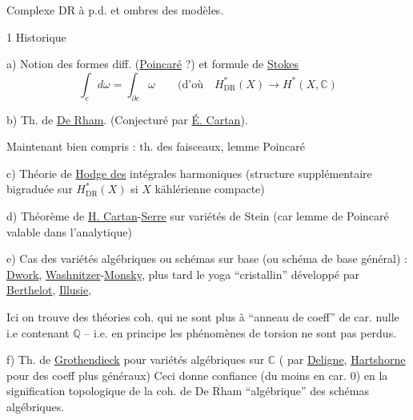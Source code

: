 Complexe DR à p.d. et ombres des modèles.


1 Historique

a) Notion des formes diff. (\uline{Poincaré} ?) et formule de \uline{Stokes}
\[
\int_c d\omega=\int_{\partial c}\omega
\qquad\text{(d'où}\quad H^{\ast}_{\mathrm{DR}}(X)\longrightarrow H^{\ast}(X,\mathbb C)
\]

b) Th. de \uline{De Rham}. (Conjecturé par \uline{É. Cartan}). 

Maintenant bien compris : th. des faisceaux, lemme Poincaré

c) Théorie de \uline{Hodge des} intégrales harmoniques (structure supplémentaire bigraduée sur $H^{\ast}_{\mathrm{DR}}(X)$ si $X$ kählérienne compacte)

d) Théorème de \uline{H. Cartan}-\uline{Serre} sur variétés de Stein (car lemme de Poincaré valable dans l'analytique)

e) Cas des variétés algébriques ou schémas sur  base (ou schéma de base général) : \uline{Dwork}, \uline{Washnitzer}-\uline{Monsky}, plus tard le yoga ``cristallin'' développé par \uline{Berthelot}, \uline{Illusie}, 

Ici on trouve des théories coh. qui ne sont plus à ``anneau de coeff''\unsure{\}} de car. nulle i.e contenant $\mathbb Q$ -- i.e. en principe les phénomènes de torsion ne sont pas perdus. 

f) Th. de \uline{Grothendieck} pour variétés algébriques sur $\mathbb C$ ( par \uline{Deligne}, \uline{Hartshorne} pour des coeff plus généraux) Ceci donne confiance (du moins en car. 0) en la signification topologique de la coh. de De Rham ``algébrique'' des schémas algébriques.

